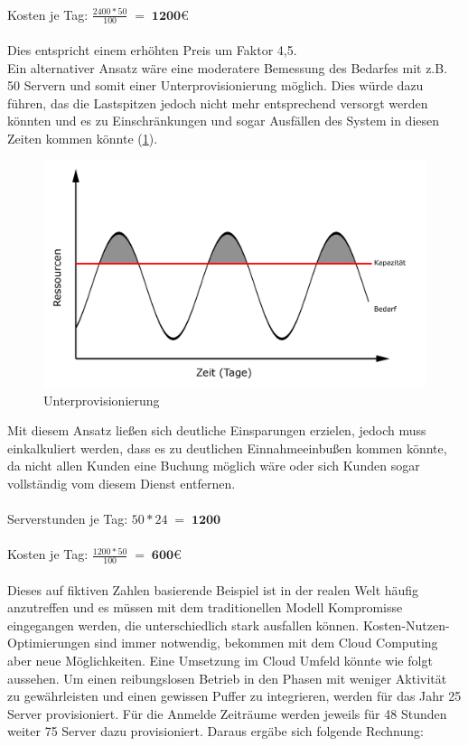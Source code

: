 \\
Kosten je Tag:           $\displaystyle \frac{2400 * 50}{100}\; =\; \textbf{1200€} $\\
\\
Dies entspricht einem erhöhten Preis um Faktor 4,5.
\\
Ein alternativer Ansatz wäre eine moderatere Bemessung des Bedarfes mit z.B. 50 Servern und somit einer Unterprovisionierung möglich. Dies würde dazu führen, das die Lastspitzen jedoch nicht mehr entsprechend versorgt werden könnten und es zu Einschränkungen und sogar Ausfällen des System in diesen Zeiten kommen könnte (\ref{fig:underprovisioning}). 
	\begin{figure}[h]
		\centering
		\includegraphics[width=0.7\linewidth]{images/underprovisioning}
		\caption{Unterprovisionierung}
		\label{fig:underprovisioning}
	\end{figure}
Mit diesem Ansatz ließen sich deutliche Einsparungen erzielen, jedoch muss einkalkuliert werden, dass es zu deutlichen Einnahmeeinbußen kommen könnte, da nicht allen Kunden eine Buchung möglich wäre oder sich Kunden sogar vollständig vom diesem Dienst entfernen.
\\
\\
Serverstunden je Tag:    $\displaystyle 50 * 24 \; =\; \textbf{1200}	 $\\
\\
Kosten je Tag:           $\displaystyle \frac{1200 * 50}{100}\; =\; \textbf{600€} $\\
\\
Dieses auf fiktiven Zahlen basierende Beispiel ist in der realen Welt häufig anzutreffen und es müssen mit dem traditionellen Modell Kompromisse eingegangen werden, die unterschiedlich stark ausfallen können. Kosten-Nutzen-Optimierungen sind immer notwendig, bekommen mit dem Cloud Computing aber neue Möglichkeiten. Eine Umsetzung im Cloud Umfeld könnte wie folgt aussehen. Um einen reibungslosen Betrieb in den Phasen mit weniger Aktivität zu gewährleisten und einen gewissen Puffer zu integrieren, werden für das Jahr 25 Server provisioniert. Für die Anmelde Zeiträume werden jeweils für 48 Stunden weiter 75 Server dazu provisioniert. Daraus ergäbe sich folgende Rechnung:
